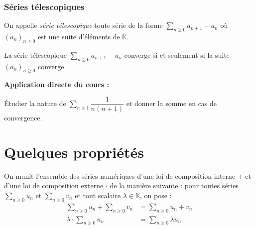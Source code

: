 \documentclass[french,11pt,twoside]{VcCours}
\newenvironment{ApplicationDirecte}{\textbf{Application directe du cours :}

}{}
\newcommand{\Sum}[2]{\ensuremath{\textstyle{\sum\limits_{#1}^{#2}}}}
\begin{document}
\newpage

\subsubsection{Séries télescopiques}

On appelle \emph{série télescopique} toute série de la forme $\Sum{n\geq 0}{} a_{n+1}-a_n$ où $(a_n)_{n \geq 0}$ est une suite d'éléments de $\mathbb{K}$.

\begin{Proposition}{}
La série télescopique $\Sum{n\geq 0}{} a_{n+1}-a_n$ converge si et seulement si la suite $(a_n)_{n \geq 0}$ converge.
\end{Proposition}

\begin{Demonstration}{} 
\vspace{3cm}
\end{Demonstration}

\medskip

\begin{ApplicationDirecte} Étudier la nature de $\Sum{n\geq 1}{} \dfrac{1}{n(n+1)}$ et donner la somme en cas de convergence.

%
\end{ApplicationDirecte}


\section{Quelques propriétés}

On munit l'ensemble des séries numériques d'une loi de composition interne $+$ et d'une loi de composition externe $\cdot$ de la manière suivante : pour toutes séries $\Sum{n \geq 0}{} u_n$ et $\Sum{n \geq 0}{} v_n$ et tout scalaire $\lambda \in \mathbb{K}$, on pose :
\begin{align*}
\Sum{n \geq 0}{} u_n + \Sum{n \geq 0}{} v_n  & = \Sum{n \geq 0}{} u_n+v_n \\
\lambda \cdot \Sum{n \geq 0}{} u_n & = \Sum{n \geq 0}{} \lambda u_n
\end{align*}
\end{document}
